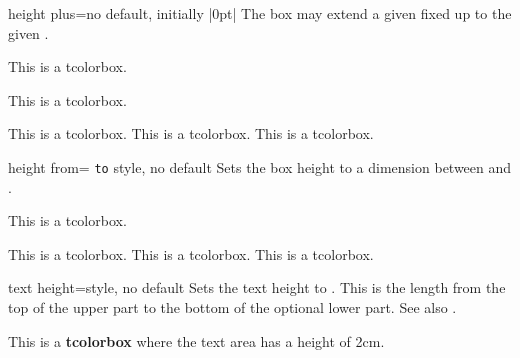 \enlargethispage*{10mm}
\begin{docTcbKey}{height plus}{=}{no default, initially |0pt|}
  The box may extend a given fixed  up to the given .
\begin{dispExample}

\begin{tcolorbox}[height=1cm]
This is a tcolorbox.
\end{tcolorbox}
\begin{tcolorbox}[height=1cm,height plus=1cm]
This is a tcolorbox.
\end{tcolorbox}
\begin{tcolorbox}[height=1cm,height plus=1cm]
This is a tcolorbox. This is a tcolorbox. This is a tcolorbox.
\end{tcolorbox}
\end{dispExample}
\end{docTcbKey}


\begin{docTcbKey}{height from}{= \texttt{to} }{style, no default}
  Sets the box height to a dimension between  and .
\begin{dispExample}

\begin{mybox}
This is a tcolorbox.
\end{mybox}
\begin{mybox}
This is a tcolorbox. This is a tcolorbox. This is a tcolorbox.
\end{mybox}
\begin{mybox}
\lipsum[2]
\end{mybox}
\end{dispExample}
\end{docTcbKey}


\begin{docTcbKey}[][doc new=2014-10-31]{text height}{=}{style, no default}
  Sets the text height to . This is the length from the top
  of the upper part to the bottom of the optional lower part.
  See also .
\begin{dispExample}

\begin{tcolorbox}[text height=2cm]
This is a \textbf{tcolorbox} where the text area has a height of 2cm.
\end{tcolorbox}
\end{dispExample}
\end{docTcbKey}

